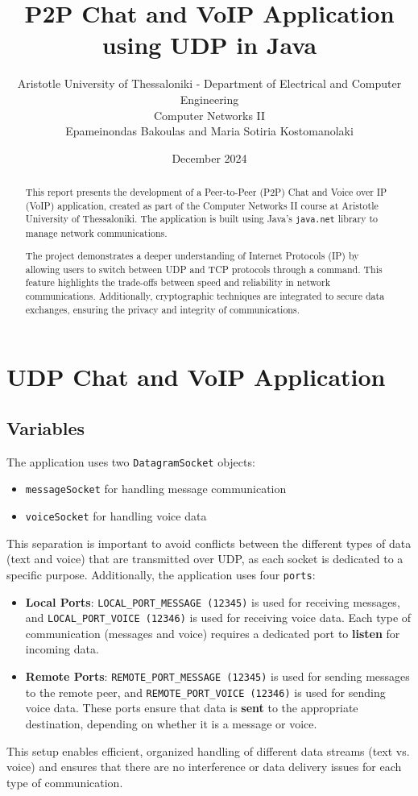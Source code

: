 \documentclass{article}
\title{P2P Chat and VoIP Application using UDP in Java}
\author{
    \small Aristotle University of Thessaloniki - Department of Electrical and Computer Engineering \\[0.5em]
    \small Computer Networks II\\[1.5em]
    Epameinondas Bakoulas and Maria Sotiria Kostomanolaki \\[1em]
}
\date{December 2024}
\begin{document}
\maketitle

\begin{abstract}
This report presents the development of a Peer-to-Peer (P2P) Chat and Voice over IP (VoIP) application, created as part of the 
Computer Networks II course at Aristotle University of Thessaloniki. The application is built using Java's \texttt{java.net} 
library to manage network communications. 

The project demonstrates a deeper understanding of Internet Protocols (IP) by allowing users to switch between UDP and TCP protocols 
through a command. This feature highlights the trade-offs between speed and reliability in network communications. 
Additionally, cryptographic techniques are integrated to secure data exchanges, ensuring the privacy and integrity of communications.
\end{abstract}

\section {UDP Chat and VoIP Application}

\subsection{Variables}
The application uses two \texttt{DatagramSocket} objects:
\begin{itemize}
    \item \texttt{messageSocket} for handling message communication
    \item \texttt{voiceSocket} for handling voice data
\end{itemize}
This separation is important to avoid conflicts between the different types of data (text and voice) that are transmitted over UDP, 
as each socket is dedicated to a specific purpose. Additionally, the application uses four \texttt{ports}:
\begin{itemize}
    \item \textbf{Local Ports}: \texttt{LOCAL_PORT_MESSAGE (12345)} is used for receiving messages, and \texttt{LOCAL_PORT_VOICE (12346)} is used 
    for receiving voice data. Each type of communication (messages and voice) requires a dedicated port to \textbf{listen} for incoming data.
    \item \textbf{Remote Ports}: \texttt{REMOTE_PORT_MESSAGE (12345)} is used for sending messages to the remote peer, and \texttt{REMOTE_PORT_VOICE (12346)} 
    is used for sending voice data. These ports ensure that data is \textbf{sent} to the appropriate destination, depending on whether it is a message or voice.
\end{itemize}
This setup enables efficient, organized handling of different data streams (text vs. voice) and ensures that there are no interference or 
data delivery issues for each type of communication.
\end{document}
